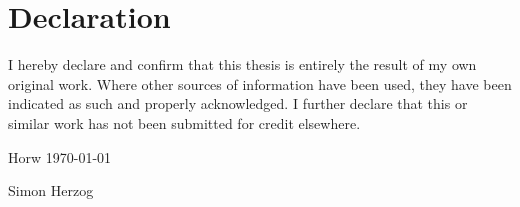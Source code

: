 \chapter*{Declaration}

I hereby declare and confirm that this thesis is entirely the result of my own original work. 
Where other sources of information have been used, they have been indicated as such and properly 
acknowledged. I further declare that this or similar work has not been submitted for credit elsewhere.

\vspace{15mm}

Horw \hspace{3mm} \today

\vspace{15mm}

Simon Herzog